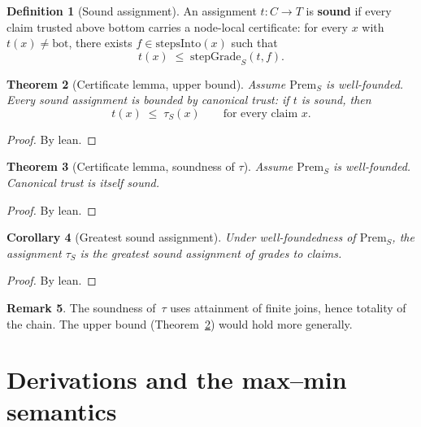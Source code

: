 \documentclass[11pt,a4paper]{article}
\theoremstyle{plain}
\newtheorem{theorem}{Theorem}[section]
\newtheorem{corollary}[theorem]{Corollary}
\theoremstyle{definition}
\newtheorem{definition}[theorem]{Definition}
\newtheorem{remark}[theorem]{Remark}
\newcommand{\bott}{\mathrm{bot}}
\newcommand{\tauCan}{\tau}
\newcommand{\Prem}{\mathrm{Prem}}
\begin{document}
\begin{definition}[Sound assignment]\label{def:sound}
An assignment $t : C \to T$ is \textbf{sound} if every claim trusted above
bottom carries a node-local certificate: for every $x$ with $t(x) \ne \bott$,
there exists $f \in \mathrm{stepsInto}(x)$ such that
\[
  t(x) \;\le\; \mathrm{stepGrade}_S(t, f).
\]
\end{definition}

\begin{theorem}[Certificate lemma, upper bound]\label{thm:sound-le-tau}
Assume $\Prem_S$ is well-founded. Every sound assignment is bounded by
canonical trust: if $t$ is sound, then
\[
  t(x) \;\le\; \tauCan_S(x)
  \qquad\text{for every claim } x.
\]
\end{theorem}

\begin{proof}
By lean.
\end{proof}

\begin{theorem}[Certificate lemma, soundness of $\tau$]\label{thm:tau-sound}
Assume $\Prem_S$ is well-founded. Canonical trust is itself sound.
\end{theorem}

\begin{proof}
By lean.
\end{proof}

\begin{corollary}[Greatest sound assignment]\label{cor:greatest}
Under well-foundedness of $\Prem_S$, the assignment $\tauCan_S$ is the
greatest sound assignment of grades to claims.
\end{corollary}

\begin{proof}
By lean.
\end{proof}

\begin{remark}
The soundness of~$\tau$ uses attainment of finite joins, hence totality of
the chain. The upper bound (Theorem~\ref{thm:sound-le-tau}) would hold more
generally.
\end{remark}

\section{Derivations and the max--min semantics}
\end{document}
